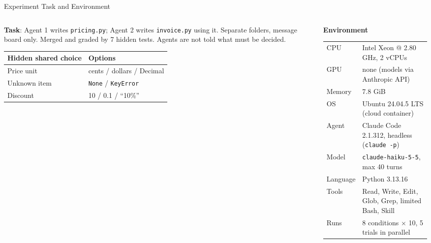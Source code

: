 \documentclass[aspectratio=169,11pt]{beamer}
\begin{document}
\begin{frame}{Experiment Task and Environment}
  \scriptsize
  \begin{columns}[T]
    \begin{column}{0.44\textwidth}
      \textbf{Task}: Agent 1 writes \texttt{pricing.py}; Agent 2 writes \texttt{invoice.py} using it. Separate folders, message board only. Merged and graded by 7 hidden tests. Agents are not told what must be decided.\\[4pt]
      \begin{tabular}{ll}
        \toprule
        Hidden shared choice & Options \\
        \midrule
        Price unit & cents / dollars / Decimal \\
        Unknown item & \texttt{None} / \texttt{KeyError} \\
        Discount & 10 / 0.1 / ``10\%'' \\
        \bottomrule
      \end{tabular}
    \end{column}
    \begin{column}{0.54\textwidth}
      \textbf{Environment}\\[2pt]
      \begin{tabular}{ll}
        \toprule
        CPU & Intel Xeon @ 2.80 GHz, 2 vCPUs \\
        GPU & none (models via Anthropic API) \\
        Memory & 7.8 GiB \\
        OS & Ubuntu 24.04.5 LTS (cloud container) \\
        Agent & Claude Code 2.1.312, headless (\texttt{claude -p}) \\
        Model & \texttt{claude-haiku-5-5}, max 40 turns \\
        Language & Python 3.13.16 \\
        Tools & Read, Write, Edit, Glob, Grep, limited Bash, Skill \\
        Runs & 8 conditions $\times$ 10, 5 trials in parallel \\
        \bottomrule
      \end{tabular}
    \end{column}
  \end{columns}
\end{frame}


\end{document}

